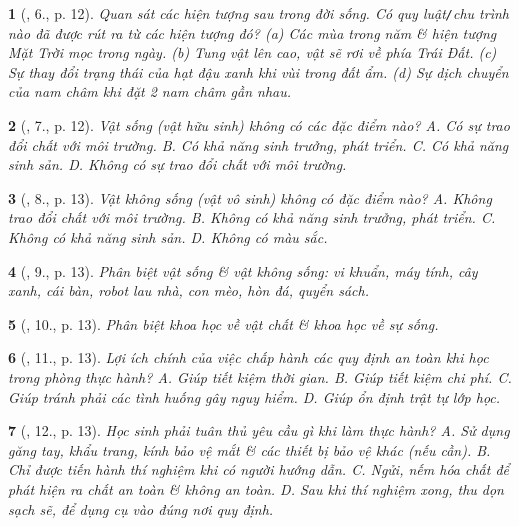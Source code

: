 \documentclass{article}
\newtheorem{baitoan}{}
\begin{document}
\begin{baitoan}[\cite{ncpt_KHTN_6_tap_1}, 6., p. 12]
	Quan sát các hiện tượng sau trong đời sống. Có quy luật{\tt/}chu trình nào đã được rút ra từ các hiện tượng đó? (a) Các mùa trong năm \& hiện tượng Mặt Trời mọc trong ngày. (b) Tung vật lên cao, vật sẽ rơi về phía Trái Đất. (c) Sự thay đổi trạng thái của hạt đậu xanh khi vùi trong đất ẩm. (d) Sự dịch chuyển của nam châm khi đặt 2 nam châm gần nhau.
\end{baitoan}

\begin{baitoan}[\cite{ncpt_KHTN_6_tap_1}, 7., p. 12]
	Vật sống (vật hữu sinh) không có các đặc điểm nào? {\sf A.} Có sự trao đổi chất với môi trường. {\sf B.} Có khả năng sinh trưởng, phát triển. {\sf C.} Có khả năng sinh sản. {\sf D.} Không có sự trao đổi chất với môi trường.
\end{baitoan}

\begin{baitoan}[\cite{ncpt_KHTN_6_tap_1}, 8., p. 13]
	Vật không sống (vật vô sinh) không có đặc điểm nào? {\sf A.} Không trao đổi chất với môi trường. {\sf B.} Không có khả năng sinh trưởng, phát triển. {\sf C.} Không có khả năng sinh sản. {\sf D.} Không có màu sắc.
\end{baitoan}

\begin{baitoan}[\cite{ncpt_KHTN_6_tap_1}, 9., p. 13]
	Phân biệt vật sống \& vật không sống: vi khuẩn, máy tính, cây xanh, cái bàn, robot lau nhà, con mèo, hòn đá, quyển sách.
\end{baitoan}

\begin{baitoan}[\cite{ncpt_KHTN_6_tap_1}, 10., p. 13]
	Phân biệt khoa học về vật chất \& khoa học về sự sống.
\end{baitoan}

\begin{baitoan}[\cite{ncpt_KHTN_6_tap_1}, 11., p. 13]
	Lợi ích chính của việc chấp hành các quy định an toàn khi học trong phòng thực hành? {\sf A.} Giúp tiết kiệm thời gian. {\sf B.} Giúp tiết kiệm chi phí. {\sf C.} Giúp tránh phải các tình huống gây nguy hiểm. {\sf D.} Giúp ổn định trật tự lớp học.
\end{baitoan}

\begin{baitoan}[\cite{ncpt_KHTN_6_tap_1}, 12., p. 13]
	Học sinh phải tuân thủ yêu cầu gì khi làm thực hành? {\sf A.} Sử dụng găng tay, khẩu trang, kính bảo vệ mắt \& các thiết bị bảo vệ khác (nếu cần). {\sf B.} Chỉ được tiến hành thí nghiệm khi có người hướng dẫn. {\sf C.} Ngửi, nếm hóa chất để phát hiện ra chất an toàn \& không an toàn. {\sf D.} Sau khi thí nghiệm xong, thu dọn sạch sẽ, để dụng cụ vào đúng nơi quy định.
\end{baitoan}
\end{document}
